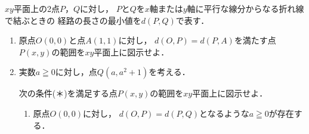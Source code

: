 \documentclass[../../main.tex]{subfiles}
\begin{document}
$xy$平面上の2点$P$，$Q$に対し，
$P$と$Q$を$x$軸または$y$軸に平行な線分からなる折れ線で結ぶときの
経路の長さの最小値を$d(P,Q)$で表す．
\begin{enumerate}
  \item 原点$O(0,0)$と点$A(1,1)$に対し，
    $d(O,P)=d(P,A)$を満たす点$P(x,y)$の範囲を$xy$平面上に図示せよ．
  \item 実数$a\geqq0$に対し，点$Q(a,a^2+1)$を考える．

    次の条件(＊)を満足する点$P(x,y)$の範囲を$xy$平面上に図示せよ．
    \begin{enumerate}
      \item[(＊)]原点$O(0,0)$に対し，
        $d(O,P)=d(P,Q)$となるような$a\geqq0$が存在する．
    \end{enumerate}
\end{enumerate}
\end{document}
